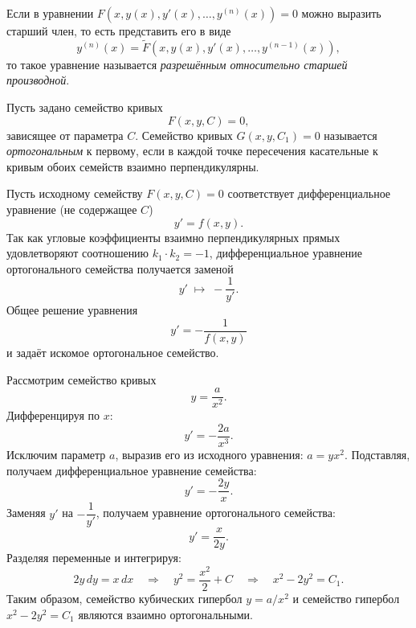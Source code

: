 \documentclass[12pt]{article}
\begin{document}
    \begin{definition}
    	Если в уравнении $F(x, y(x), y'(x), \dots, y^{(n)}(x)) = 0$ можно выразить старший член, то есть представить его в виде
    	\[
    		y^{(n)}(x) = \tilde{F}(x, y(x), y'(x), \dots, y^{(n-1)}(x)),
    	\]
    	то такое уравнение называется \emph{разрешённым относительно старшей производной}.
    \end{definition}

    \begin{definition}
    	Пусть задано семейство кривых
    	\[
    		F(x, y, C) = 0,
    	\]
    	зависящее от параметра $C$. Семейство кривых $G(x, y, C_1) = 0$ называется \emph{ортогональным} к первому, если в каждой точке пересечения касательные к кривым обоих семейств взаимно перпендикулярны.
    \end{definition}

    \begin{method}
    	Пусть исходному семейству $F(x, y, C) = 0$ соответствует дифференциальное уравнение (не содержащее $C$)
    	\[
    		y' = f(x, y).
    	\]
    	Так как угловые коэффициенты взаимно перпендикулярных прямых удовлетворяют соотношению $k_1 \cdot k_2 = -1$, дифференциальное уравнение ортогонального семейства получается заменой
    	\[
    		y' \; \longmapsto \; -\frac{1}{y'}.
    	\]
    	Общее решение уравнения
    	\[
    		y' = -\frac{1}{f(x, y)}
    	\]
    	и задаёт искомое ортогональное семейство.
    \end{method}

    \begin{example}[Ортогональное семейство для $y = a/x^2$]
    	Рассмотрим семейство кривых
    	\[
    		y = \frac{a}{x^2}.
    	\]
    	Дифференцируя по $x$:
    	\[
    		y' = -\frac{2a}{x^3}.
    	\]
    	Исключим параметр $a$, выразив его из исходного уравнения: $a = yx^2$. Подставляя, получаем дифференциальное уравнение семейства:
    	\[
    		y' = -\frac{2y}{x}.
    	\]
    	Заменяя $y'$ на $-\dfrac{1}{y'}$, получаем уравнение ортогонального семейства:
    	\[
    		y' = \frac{x}{2y}.
    	\]
    	Разделяя переменные и интегрируя:
    	\[
    		2y\,dy = x\,dx \quad\Longrightarrow\quad y^2 = \frac{x^2}{2} + C \quad\Longrightarrow\quad x^2 - 2y^2 = C_1.
    	\]
    	Таким образом, семейство кубических гипербол $y = a/x^2$ и семейство гипербол $x^2 - 2y^2 = C_1$ являются взаимно ортогональными.
    \end{example}
    
\end{document}
